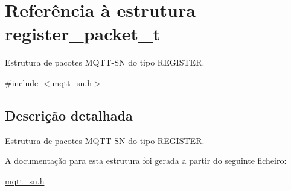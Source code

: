 \hypertarget{structregister__packet__t}{\section{Referência à estrutura register\+\_\+packet\+\_\+t}
\label{structregister__packet__t}
}


Estrutura de pacotes M\+Q\+T\+T-\/\+S\+N do tipo R\+E\+G\+I\+S\+T\+E\+R.  




{\ttfamily \#include $<$mqtt\+\_\+sn.\+h$>$}



\subsection{Descrição detalhada}
Estrutura de pacotes M\+Q\+T\+T-\/\+S\+N do tipo R\+E\+G\+I\+S\+T\+E\+R. 

A documentação para esta estrutura foi gerada a partir do seguinte ficheiro\+:\begin{DoxyCompactItemize}
\item 
\hyperlink{mqtt__sn_8h}{mqtt\+\_\+sn.\+h}\end{DoxyCompactItemize}
